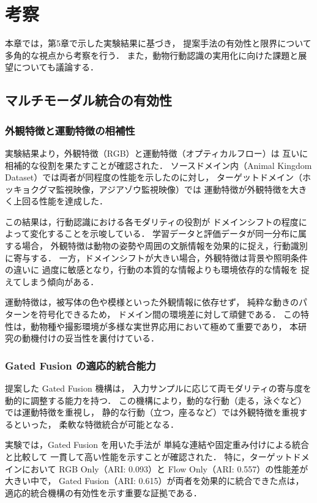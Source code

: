 \chapter{考察}
\label{chap:discussion}

本章では，第5章で示した実験結果に基づき，
提案手法の有効性と限界について多角的な視点から考察を行う．
また，動物行動認識の実用化に向けた課題と展望についても議論する．

\section{マルチモーダル統合の有効性}

\subsection{外観特徴と運動特徴の相補性}
実験結果より，外観特徴（RGB）と運動特徴（オプティカルフロー）は
互いに相補的な役割を果たすことが確認された．
ソースドメイン内（Animal Kingdom Dataset）では両者が同程度の性能を示したのに対し，
ターゲットドメイン（ホッキョクグマ監視映像，アジアゾウ監視映像）では
運動特徴が外観特徴を大きく上回る性能を達成した．

この結果は，行動認識における各モダリティの役割が
ドメインシフトの程度によって変化することを示唆している．
学習データと評価データが同一分布に属する場合，
外観特徴は動物の姿勢や周囲の文脈情報を効果的に捉え，行動識別に寄与する．
一方，ドメインシフトが大きい場合，外観特徴は背景や照明条件の違いに
過度に敏感となり，行動の本質的な情報よりも環境依存的な情報を
捉えてしまう傾向がある．

運動特徴は，被写体の色や模様といった外観情報に依存せず，
純粋な動きのパターンを符号化できるため，
ドメイン間の環境差に対して頑健である．
この特性は，動物種や撮影環境が多様な実世界応用において極めて重要であり，
本研究の動機付けの妥当性を裏付けている．

\subsection{Gated Fusion の適応的統合能力}
提案した Gated Fusion 機構は，
入力サンプルに応じて両モダリティの寄与度を動的に調整する能力を持つ．
この機構により，動的な行動（走る，泳ぐなど）では運動特徴を重視し，
静的な行動（立つ，座るなど）では外観特徴を重視するといった，
柔軟な特徴統合が可能となる．

実験では，Gated Fusion を用いた手法が
単純な連結や固定重み付けによる統合と比較して
一貫して高い性能を示すことが確認された．
特に，ターゲットドメインにおいて
RGB Only（ARI: 0.093）と Flow Only（ARI: 0.557）の性能差が大きい中で，
Gated Fusion（ARI: 0.615）が両者を効果的に統合できた点は，
適応的統合機構の有効性を示す重要な証拠である．


